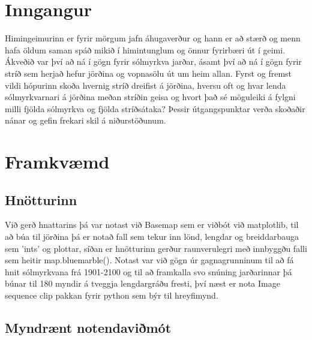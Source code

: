 \documentclass[12pt, git, final]{rureport}
\begin{document}
\maketitle  %


%
\section{Inngangur} %
Himingeimurinn er fyrir mörgum jafn áhugaverður og hann er að stærð og menn hafa öldum saman spáð mikið í himintunglum og önnur fyrirbæri út í geimi. Ákveðið var því að ná í gögn fyrir sólmyrkva jarðar, ásamt því að ná í gögn fyrir stríð  sem herjað hefur jörðina og vopnasölu út um heim allan. Fyrst og fremst vildi hópurinn skoða hvernig stríð dreifist á jörðina, hversu oft og hvar lenda sólmyrkvarnari á jörðina meðan stríðin geisa og hvort það sé möguleiki á fylgni milli fjölda sólmyrkva og fjölda stríðsátaka? Þessir útgangspunktar verða skoðaðir nánar og gefin frekari skil á niðurstöðunum.  
\section{Framkvæmd}
\subsection{Hnötturinn}
Við gerð hnattarins þá var notast við Basemap sem er viðbót við matplotlib, til að búa til jörðina þá er notað fall sem tekur inn lönd, lengdar og breiddarbauga sem 'ints' og plottar, síðan er hnötturinn gerður raunverulegri með innbyggðu falli sem heitir map.bluemarble(). Notast var við gögn úr gagnagrunninum til að fá hnit sólmyrkvana frá 1901-2100 og til að framkalla svo snúning jarðarinnar þá búnar til 180 myndir á tveggja lengdargráðu fresti, því næst er nota Image sequence clip pakkan fyrir python sem býr til hreyfimynd.
 
\subsection{Myndrænt notendaviðmót}
\end{document}
